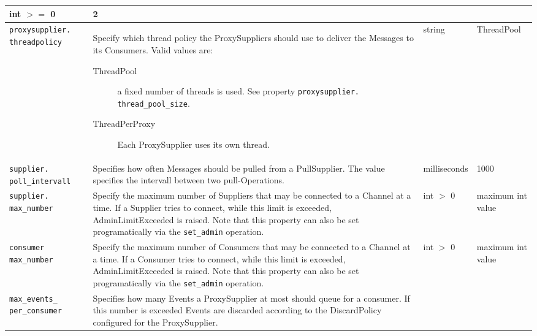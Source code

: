 \begin{small}
\begin{longtable}{|p{5cm}|p{7.5cm}|p{1.5cm}|p{1.5cm}|}
    int $>=$ 0 & 

    2 \\ \hline

    \verb"proxysupplier."
    \verb"threadpolicy" &

    Specify which thread policy the ProxySuppliers should use to deliver
    the Messages to its Consumers. Valid values are: 
    \begin{description}     
    \item[ThreadPool] a fixed number of threads is used. See property
      \verb"proxysupplier."
      \verb"thread_pool_size".

    \item[ThreadPerProxy] Each ProxySupplier uses its own thread.
      
    \end{description} & 
    string & Thread\-Pool \\ \hline

    \verb"supplier."
    \verb"poll_intervall" &

    Specifies how often Messages should be pulled from a PullSupplier. The
    value specifies the intervall between two pull-Operations. &

    milli\-seconds & 1000 \\ \hline

    \verb"supplier."
    \verb"max_number" &

    Specify the maximum number of Suppliers that may be connected to a
    Channel at a time. If a Supplier tries to connect, while this
    limit is exceeded, AdminLimitExceeded is raised. Note that this
    property can also be set programatically via the \texttt{set\_admin}
    operation. & int $>$ 0 & maximum int value \\ \hline

    \verb"consumer"
    \verb"max_number" &

    Specify the maximum number of Consumers that may be connected to a
    Channel at a time. If a Consumer tries to connect, while this
    limit is exceeded, AdminLimitExceeded is raised. Note that this
    property can also be set programatically via the
    \texttt{set\_admin} operation. &

    int $>$ 0 & maximum int value \\ \hline

    \verb"max_events_"
    \verb"per_consumer" &

    Specifies how many Events a ProxySupplier at most should queue for a
    consumer. If this number is exceeded Events are discarded according to
    the DiscardPolicy configured for the ProxySupplier. &


\end{longtable}
\end{small}
